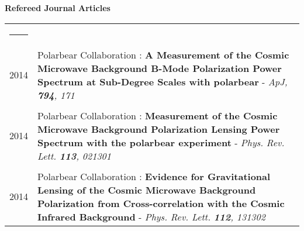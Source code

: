 \documentclass[a4paper,oneside]{article}
\newcommand{\ligne}[1]{\rule[0.5ex]{\textwidth}{#1}\\}
\newcommand{\interRubrique}{\bigskip}
\newcommand{\styleRub}[1]{\noindent\textbf{\large #1}\par}
\newcommand{\indentStd}{\noindent\hspace{\lenA}}
\newenvironment{rubrique}[2][\linewidth] {
    \styleRub{#2}
    \setlength{\lenB}{#1}
    \setlength{\lenC}{\linewidth}
    \addtolength{\lenC}{-\lenA}
    \addtolength{\lenC}{-\lenB}
    \addtolength{\lenC}{-\parindent}
    \addtolength{\lenC}{-9pt}
    \indentStd\begin{tabular}[t]{p{\lenB}p{\lenC}}
}
{\end{tabular}}
\newcommand{\lieu}[1]{\small{\textsl{#1}\ }}
\begin{document}
\begin{rubrique}[3.4cm]{Refereed Journal Articles}
    \ligne{0.1mm}
    
2014
& Polarbear Collaboration : \textbf{A Measurement of the Cosmic Microwave Background B-Mode Polarization Power Spectrum at Sub-Degree Scales with {\sc polarbear}} - \lieu{ApJ, \textbf{794}, 171}\\ \\

2014
& Polarbear Collaboration : \textbf{Measurement of the Cosmic Microwave Background Polarization Lensing Power Spectrum with the {\sc polarbear} experiment} - \lieu{Phys. Rev. Lett. \textbf{113}, 021301}\\ \\

2014
& Polarbear Collaboration : \textbf{Evidence for Gravitational Lensing of the Cosmic Microwave Background Polarization from Cross-correlation with the Cosmic Infrared Background} - \lieu{Phys. Rev. Lett. \textbf{112}, 131302}\\

\end{rubrique}

\interRubrique
\end{document}
